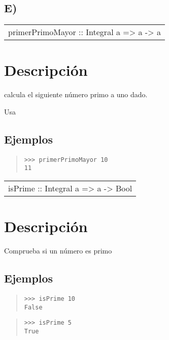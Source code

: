 \subsection{E)}
\begin{haddockdesc}
\item[\begin{tabular}{@{}l}
primerPrimoMayor :: Integral a => a -> a
\end{tabular}]
{\haddockbegindoc
\section*{Descripción}
calcula el siguiente número primo a uno dado.\par
Usa \par
\subsection*{Ejemplos}
\begin{quote}
{\haddockverb\begin{verbatim}
>>> primerPrimoMayor 10
11

\end{verbatim}}
\end{quote}}
\end{haddockdesc}
\begin{haddockdesc}
\item[\begin{tabular}{@{}l}
isPrime :: Integral a => a -> Bool
\end{tabular}]
{\haddockbegindoc
\section*{Descripción}
Comprueba si un número es primo\par
\subsection*{Ejemplos}
\begin{quote}
{\haddockverb\begin{verbatim}
>>> isPrime 10
False

\end{verbatim}}
\end{quote}
\begin{quote}
{\haddockverb\begin{verbatim}
>>> isPrime 5
True

\end{verbatim}}
\end{quote}}
\end{haddockdesc}

